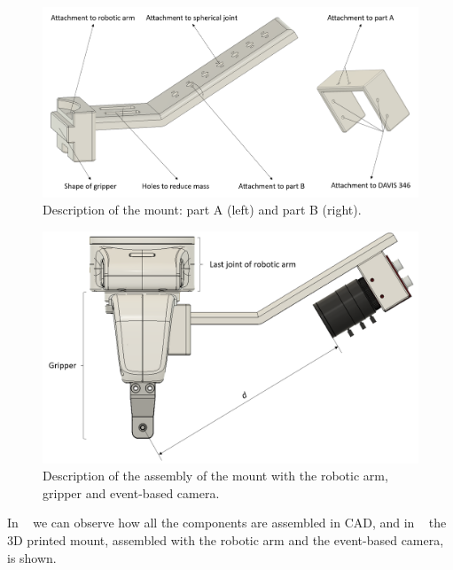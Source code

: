 \begin{figure}[H]
    \centering
    \includegraphics[width=\textwidth]{resources/images/mount_description}
    \caption{Description of the mount: part A (left) and part B (right).}\label{fig:mount}
\end{figure}

\begin{figure}[H]
    \centering
    \includegraphics[width=\textwidth]{resources/images/assembly_description}
    \caption{Description of the assembly of the mount with the robotic arm, gripper and event-based camera.}\label{fig:assembly}
\end{figure}

In ~ we can observe how all the components are assembled in CAD, and in ~ the 3D printed mount, assembled with the robotic arm and the event-based camera, is shown.

